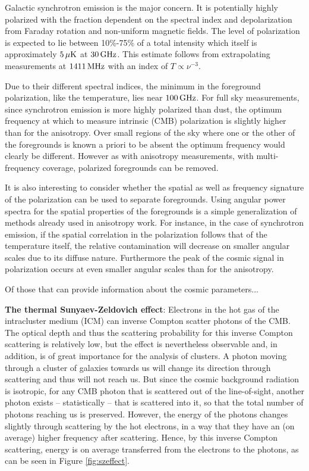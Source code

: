 \documentclass[a4paper,11pt]{article}
\begin{document}
{\noindent}Galactic synchrotron emission is the major concern. It is potentially highly polarized with the fraction dependent on the spectral index and depolarization from Faraday rotation and non-uniform magnetic fields. The level of polarization is expected to lie between 10\%-75\% of a total intensity which itself is approximately $5\,\mu{\rm K}$ at $30\,{\rm GHz}$. This estimate follows from extrapolating measurements at $1411\,{\rm MHz}$ with an index of $T\propto\nu^{-3}$.

{\noindent}Due to their different spectral indices, the minimum in the foreground polarization, like the temperature, lies near $100\,{\rm GHz}$. For full sky measurements, since synchrotron emission is more highly polarized than dust, the optimum frequency at which to measure intrinsic (CMB) polarization is slightly higher than for the anisotropy. Over small regions of the sky where one or the other of the foregrounds is known a priori to be absent the optimum frequency would clearly be different. However as with anisotropy measurements, with multi-frequency coverage, polarized foregrounds can be removed.

{\noindent}It is also interesting to consider whether the spatial as well as frequency signature of the polarization can be used to separate foregrounds. Using angular power spectra for the spatial properties of the foregrounds is a simple generalization of methods already used in anisotropy work. For instance, in the case of synchrotron emission, if the spatial correlation in the polarization follows that of the temperature itself, the relative contamination will decrease on smaller angular scales due to its diffuse nature. Furthermore the peak of the cosmic signal in polarization occurs at even smaller angular scales than for the anisotropy.

{\noindent}Of those that can provide information about the cosmic parameters...

{\noindent}\textbf{The thermal Sunyaev-Zeldovich effect}: Electrons in the hot gas of the intracluster medium (ICM) can inverse Compton scatter photons of the CMB. The optical depth and thus the scattering probability for this inverse Compton scattering is relatively low, but the effect is nevertheless observable and, in addition, is of great importance for the analysis of clusters. A photon moving through a cluster of galaxies towards us will change its direction through scattering and thus will not reach us. But since the cosmic background radiation is isotropic, for any CMB photon that is scattered out of the line-of-sight, another photon exists -- statistically -- that is scattered into it, so that the total number of photons reaching us is preserved. However, the energy of the photons changes slightly through scattering by the hot electrons, in a way that they have an (on average) higher frequency after scattering. Hence, by this inverse Compton scattering, energy is on average transferred from the electrons to the photons, as can be seen in Figure \ref{fig:szeffect}.
\end{document}
